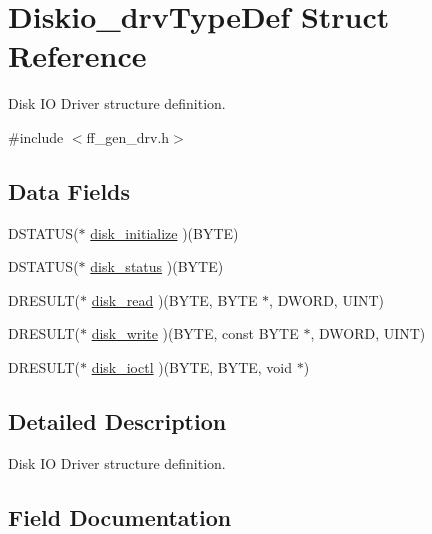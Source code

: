 \hypertarget{struct_diskio__drv_type_def}{}\section{Diskio\+\_\+drv\+Type\+Def Struct Reference}
\label{struct_diskio__drv_type_def}


Disk IO Driver structure definition.  




{\ttfamily \#include $<$ff\+\_\+gen\+\_\+drv.\+h$>$}

\subsection*{Data Fields}
\begin{DoxyCompactItemize}
\item 
D\+S\+T\+A\+T\+US($\ast$ \hyperlink{struct_diskio__drv_type_def_a0a76a71f4c60db374e4f71c8dda1bc3a}{disk\+\_\+initialize} )(B\+Y\+TE)
\item 
D\+S\+T\+A\+T\+US($\ast$ \hyperlink{struct_diskio__drv_type_def_af5745ab1618254bca05d433492bc6a49}{disk\+\_\+status} )(B\+Y\+TE)
\item 
D\+R\+E\+S\+U\+LT($\ast$ \hyperlink{struct_diskio__drv_type_def_a99988d3379fff5ce83d69ed8aa4d3d58}{disk\+\_\+read} )(B\+Y\+TE, B\+Y\+TE $\ast$, D\+W\+O\+RD, U\+I\+NT)
\item 
D\+R\+E\+S\+U\+LT($\ast$ \hyperlink{struct_diskio__drv_type_def_abc6ae3a939d7b40e41ce0d0ff3381b84}{disk\+\_\+write} )(B\+Y\+TE, const B\+Y\+TE $\ast$, D\+W\+O\+RD, U\+I\+NT)
\item 
D\+R\+E\+S\+U\+LT($\ast$ \hyperlink{struct_diskio__drv_type_def_a5fa782f00378c004758c9a8f7860e600}{disk\+\_\+ioctl} )(B\+Y\+TE, B\+Y\+TE, void $\ast$)
\end{DoxyCompactItemize}


\subsection{Detailed Description}
Disk IO Driver structure definition. 

\subsection{Field Documentation}
\mbox{\label{struct_diskio__drv_type_def_a0a76a71f4c60db374e4f71c8dda1bc3a}} 
